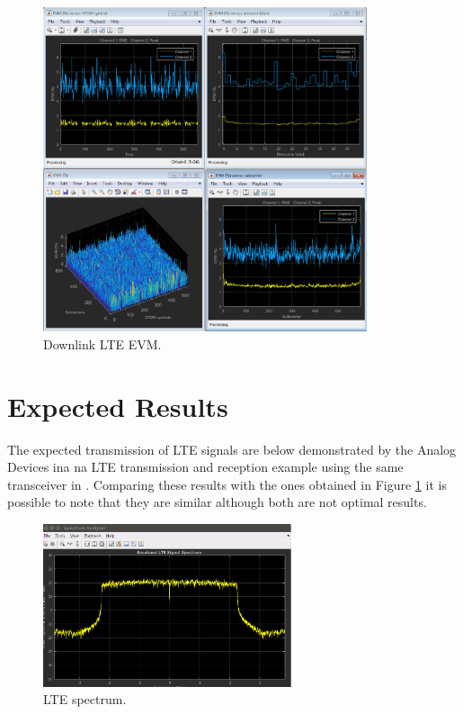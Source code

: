 %
\begin{figure}[htbp]
    \centering
    \includegraphics[width=0.85\textwidth]{./figures/evm}
    \caption{ Downlink LTE EVM.
    \label{fig:evm}}
\end{figure}
%
\vfill
\clearpage

\section{Expected Results}
\label{result:optimum}

The expected transmission of LTE signals are below demonstrated by the Analog
Devices ina na LTE transmission and reception example using the same
transceiver in \cite{web:lteexamplewiki}. Comparing these results with the ones
obtained in Figure \ref{fig:evm} it is possible to note that they are similar
although both are not optimal results.

\begin{figure}[htbp]
    \centering
    \includegraphics[width=0.65\textwidth]{./figures/lte_spectrum_iio}
    \caption{ LTE spectrum.
    \label{fig:ltespectrumiio}}
\end{figure}

